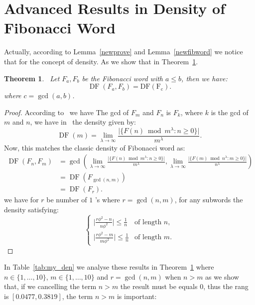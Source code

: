 \documentclass[12pt, a4paper]{article}
\newtheorem{theorem}{Theorem}[section]
\begin{document}
\section{Advanced Results in Density of Fibonacci Word}\label{sec4}
Actually, according to Lemma~\ref{newprove} and Lemma~\ref{newfibword} we notice that for the concept of density. As we show that in Theorem~\ref{newconc}.
\begin{theorem}~\label{newconc}
Let $F_a,F_b$ be the Fibonacci word with $a\leq b$, then we have: 
\[
\operatorname{DF}(F_a,F_b)=\operatorname{DF(F_c)}.
\]
where $c=\gcd(a,b)$.
\end{theorem}
\begin{proof}
According to~\cite{KalmanDSMena} we have The gcd of $F_m$ and $F_n$ is $F_k$, where $k$ is the gcd of $m$ and $n$, we have in~\cite{Hamoud2024Abdullah,path3} the density given by: 
\[
	\operatorname{DF}(m) = \lim_{\lambda \to \infty} \frac{\lvert\{F(n) \bmod m^\lambda : n \geq 0\}\rvert}{m^\lambda}.
\]
Now, this matches the classic density of Fibonacci word as: 
\begin{align*}
\operatorname{DF}(F_n,F_m) &=\gcd \left( \lim_{\lambda \to \infty} \frac{\lvert\{F(n) \bmod m^\lambda : n \geq 0\}\rvert}{m^\lambda}, \lim_{\lambda \to \infty} \frac{\lvert\{F(m) \bmod n^\lambda : m \geq 0\}\rvert}{n^\lambda} \right)\\
&=\operatorname{DF}(F_{\gcd(n,m)})\\
&=\operatorname{DF}(F_r).
\end{align*}
we have for $r$ be number of $1$ 's where $r=\gcd(n,m)$, for any subwords the density satisfying: 
\[
\begin{cases}
\lvert \frac{r\phi^2-n}{n\phi^2} \rvert \leq \frac{1}{n} & \text{of length $n$},\\
\lvert \frac{r\phi^2-m}{m\phi^2} \rvert \leq \frac{1}{n} & \text{of length $m$}.
\end{cases}
\]
\end{proof}
In Table~\ref{tab:my_den} we analyse these results in Theorem~\ref{newconc} where $n\in \{1,\dots,10\}$, $m\in\{1,\dots,10\}$ and  $r=\gcd(n,m)$ when $n>m$ as we show that, if we cancelling the term $n>m$ the result must be equals $0$, thus the rang is $[0.0477, 0.3819]$, the term $n>m$ is important:
\end{document}
